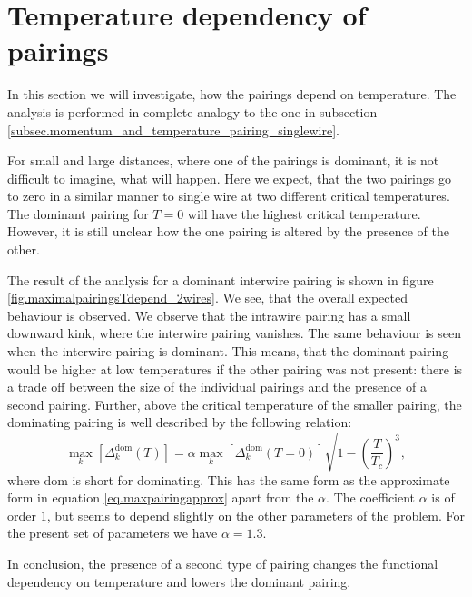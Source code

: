 \section{Temperature dependency of pairings} \label{sec.2wirespairingstemperature}
In this section we will investigate, how the pairings depend on temperature. The analysis is performed in complete analogy to the one in subsection \ref{subsec.momentum_and_temperature_pairing_singlewire}. 

For small and large distances, where one of the pairings is dominant, it is not difficult to imagine, what will happen. Here we expect, that the two pairings go to zero in a similar manner to single wire at two different critical temperatures. The dominant pairing for $T = 0$ will have the highest critical temperature. However, it is still unclear how the one pairing is altered by the presence of the other.

The result of the analysis for a dominant interwire pairing is shown in figure \ref{fig.maximalpairingsTdepend_2wires}. We see, that the overall expected behaviour is observed. We observe that the intrawire pairing has a small downward kink, where the interwire pairing vanishes. The same behaviour is seen when the interwire pairing is dominant. This means, that the dominant pairing would be higher at low temperatures if the other pairing was not present: there is a trade off between the size of the individual pairings and the presence of a second pairing. Further, above the critical temperature of the smaller pairing, the dominating pairing is well described by the following relation:
\begin{equation}
\max_k[\Delta^{\text{dom}}_k(T)] = \alpha \max_k[\Delta^{\text{dom}}_k(T = 0)] \sqrt{1 - \left(\frac{T}{T_c}\right)^3},
\label{eq.DeltaapproxaboveTC1}
\end{equation}
where $\text{dom}$ is short for dominating. This has the same form as the approximate form in equation \eqref{eq.maxpairingapprox} apart from the $\alpha$. The coefficient $\alpha$ is of order $1$, but seems to depend slightly on the other parameters of the problem. For the present set of parameters we have $\alpha = 1.3$. 

In conclusion, the presence of a second type of pairing changes the functional dependency on temperature and lowers the dominant pairing.

